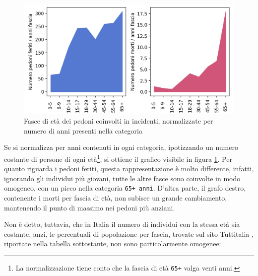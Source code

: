 \documentclass[a4paper,12pt]{report}
\newcommand{\columnstyle}[1]{\texttt{#1}}
\begin{document}
\begin{figure}
    \includegraphics[width=\linewidth]{../src/incidenti/incidenti_senza_coords/pedoni/eta_pedoni.png}
    \caption{Fasce di età dei pedoni coinvolti in incidenti, normalizzate per numero di anni 
    presenti nella categoria}
    \label{fig:eta-pedoni}
\end{figure}

Se si normalizza per anni contenuti in ogni categoria, ipotizzando un numero 
costante di persone di ogni età\footnote{La normalizzazione tiene conto 
che la fascia di età \columnstyle{65+} valga venti anni.}, 
si ottiene il grafico visibile in figura \ref{fig:eta-pedoni}. 
Per quanto riguarda i pedoni feriti, 
questa rappresentazione è molto differente, infatti, 
ignorando gli individui più giovani, tutte le altre fasce sono coinvolte 
in modo omogeneo, con un picco nella categoria \columnstyle{65+ anni}. 
D'altra parte, il grafo destro, contenente i morti per fascia di età, 
non subisce un grande cambiamento, mantenendo il punto di massimo nei 
pedoni più anziani. 

Non è detto, tuttavia, che in Italia il numero di individui con 
la stessa età sia costante, anzi, le percentuali di popolazione per fascia, 
trovate sul sito Tuttitalia \cite{TUTTITALIA:1}, riportate nella tabella 
sottostante, non sono particolarmente omogenee: 
\end{document}
